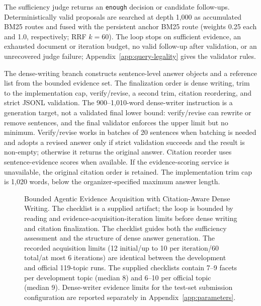 The sufficiency judge returns an \texttt{enough} decision or candidate
follow-ups. Deterministically valid proposals are searched at depth 1,000
as accumulated BM25 routes and fused with the persistent anchor BM25 route
(weights 0.25 each and 1.0, respectively; RRF $k=60$). The loop stops on
sufficient evidence, an exhausted document or iteration budget, no valid
follow-up after validation, or an unrecovered judge failure;
Appendix~\ref{app:query-legality} gives
the validator rules.

The dense-writing branch constructs sentence-level answer objects and a reference list
from the bounded evidence set. The finalization order is dense writing,
trim to the implementation cap, verify/revise, a second trim, citation
reordering, and strict JSONL validation. The 900--1,010-word dense-writer
instruction is a generation target, not a validated final lower bound:
verify/revise can rewrite or remove sentences, and the final validator
enforces the upper limit but no minimum. Verify/revise works in batches of
20 sentences when batching is needed and adopts a revised answer only
if strict validation succeeds and the result is non-empty; otherwise it
returns the original answer. Citation reorder uses sentence-evidence
scores when available. If the evidence-scoring service is unavailable,
the original citation order is retained. The implementation trim cap is
1,020 words, below the organizer-specified maximum answer length.

\begin{figure}[t]
\centering
\resizebox{0.98\textwidth}{!}{}
\caption{Bounded Agentic Evidence Acquisition with Citation-Aware Dense
Writing. The checklist is a supplied artifact; the loop is bounded by
reading and evidence-acquisition-iteration limits before dense writing and citation finalization.
The checklist guides both the sufficiency assessment and the structure
of dense answer generation.
The recorded acquisition limits (12 initial/up to 10 per iteration/60
total/at most 6 iterations) are identical between
the development and official 119-topic runs. The supplied checklists
contain 7--9 facets per development topic (median 8) and 6--10 per
official topic (median 9). Dense-writer evidence limits for the
test-set submission configuration are reported separately in
Appendix~\ref{app:parameters}.}
\label{fig:rag}
\end{figure}
